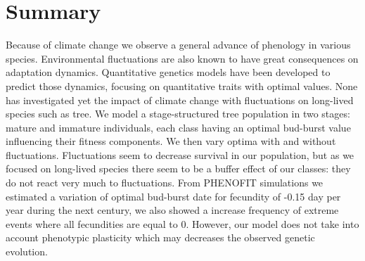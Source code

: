 \section*{Summary}

Because of climate change we observe a general advance of phenology in various species. Environmental fluctuations are also known to have great consequences on adaptation dynamics. Quantitative genetics models have been developed to predict those dynamics, focusing on quantitative traits with optimal values. None has investigated yet the impact of climate change with fluctuations on long-lived species such as tree.
We model a stage-structured tree population in two stages: mature and immature individuals, each class having an optimal bud-burst value influencing their fitness components. We then vary optima with and without fluctuations.
Fluctuations seem to decrease survival in our population, but as we focused on long-lived species there seem to be a buffer effect of our classes: they do not react very much to fluctuations. From \textsc{PHENOFIT} simulations we estimated a variation of optimal bud-burst date for fecundity of -0.15 day per year during the next century, we also showed a increase frequency of extreme events where all fecundities are equal to 0.
However, our model does not take into account phenotypic plasticity which may decreases the observed genetic evolution.